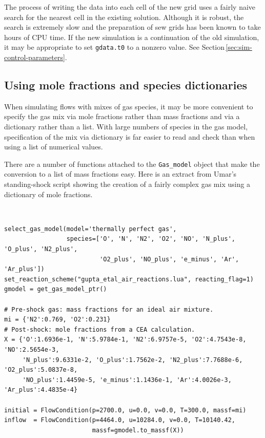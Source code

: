 The process of writing the data into each cell of the new grid uses a fairly naive search for the 
nearest cell in the existing solution.
Although it is robust, the search is extremely slow and the preparation of sew grids has been known
to take hours of CPU time.
If the new simulation is a continuation of the old simulation, it may be appropriate to set
\texttt{gdata.t0} to a nonzero value.  See Section\,\ref{sec:sim-control-parameters}.

\subsection{Using mole fractions and species dictionaries}
\label{sec:MoleFractions}
%
When simulating flows with mixes of gas species, it may be more convenient to specify the gas mix
via mole fractions rather than mass fractions and via a dictionary rather than a list.
With large numbers of species in the gas model, specification of the mix via dictionary is far easier to
read and check than when using a list of numerical values. 

\medskip
There are a number of functions attached to the \texttt{Gas\_model} object that make the
conversion to a list of mass fractions easy.
Here is an extract from Umar's standing-shock script showing the creation of a fairly complex gas mix
using a dictionary of mole fractions.

\medskip\noindent\topbar\\
{\small %
\begin{verbatim}
select_gas_model(model='thermally perfect gas', 
                 species=['O', 'N', 'N2', 'O2', 'NO', 'N_plus', 'O_plus', 'N2_plus',
                          'O2_plus', 'NO_plus', 'e_minus', 'Ar', 'Ar_plus'])
set_reaction_scheme("gupta_etal_air_reactions.lua", reacting_flag=1)
gmodel = get_gas_model_ptr()

# Pre-shock gas: mass fractions for an ideal air mixture.
mi = {'N2':0.769, 'O2':0.231}
# Post-shock: mole fractions from a CEA calculation.
X = {'O':1.6936e-1, 'N':5.9784e-1, 'N2':6.9757e-5, 'O2':4.7543e-8, 'NO':2.5654e-3, 
     'N_plus':9.6331e-2, 'O_plus':1.7562e-2, 'N2_plus':7.7688e-6, 'O2_plus':5.0837e-8, 
     'NO_plus':1.4459e-5, 'e_minus':1.1436e-1, 'Ar':4.0026e-3, 'Ar_plus':4.4835e-4}

initial = FlowCondition(p=2700.0, u=0.0, v=0.0, T=300.0, massf=mi)
inflow  = FlowCondition(p=4464.0, u=10284.0, v=0.0, T=10140.42,
                        massf=gmodel.to_massf(X))
\end{verbatim}
}
\noindent\bottombar


